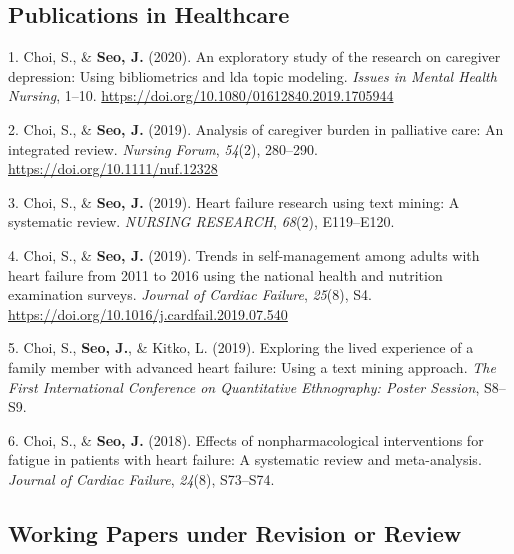 \documentclass[11pt,a4paper,]{awesome-cv}
\begin{document}
\hypertarget{publications-in-healthcare}{%
  \subsection{Publications in
    Healthcare}\label{publications-in-healthcare}}

\hypertarget{bibliography}{}
\leavevmode\hypertarget{ref-doi:10.1080ux2f01612840.2019.1705944}{}%
1. Choi, S., \& \textbf{Seo, J.} (2020). An exploratory study of the
research on caregiver depression: Using bibliometrics and lda topic
modeling. \emph{Issues in Mental Health Nursing}, 1--10.
\url{https://doi.org/10.1080/01612840.2019.1705944}

\leavevmode\hypertarget{ref-doi:10.1111ux2fnuf.12328}{}%
2. Choi, S., \& \textbf{Seo, J.} (2019). Analysis of caregiver burden in
palliative care: An integrated review. \emph{Nursing Forum},
\emph{54}(2), 280--290. \url{https://doi.org/10.1111/nuf.12328}

\leavevmode\hypertarget{ref-choi2019heart}{}%
3. Choi, S., \& \textbf{Seo, J.} (2019). Heart failure research using
text mining: A systematic review. \emph{NURSING RESEARCH}, \emph{68}(2),
E119--E120.

\leavevmode\hypertarget{ref-choi2019trends}{}%
4. Choi, S., \& \textbf{Seo, J.} (2019). Trends in self-management among
adults with heart failure from 2011 to 2016 using the national health
and nutrition examination surveys. \emph{Journal of Cardiac Failure},
\emph{25}(8), S4. \url{https://doi.org/10.1016/j.cardfail.2019.07.540}

\leavevmode\hypertarget{ref-choi2019exploring}{}%
5. Choi, S., \textbf{Seo, J.}, \& Kitko, L. (2019). Exploring the lived
experience of a family member with advanced heart failure: Using a text
mining approach. \emph{The First International Conference on
  Quantitative Ethnography: Poster Session}, S8--S9.

\leavevmode\hypertarget{ref-choi2018effects}{}%
6. Choi, S., \& \textbf{Seo, J.} (2018). Effects of nonpharmacological
interventions for fatigue in patients with heart failure: A systematic
review and meta-analysis. \emph{Journal of Cardiac Failure},
\emph{24}(8), S73--S74.

\hypertarget{working-papers-under-revision-or-review}{%
  \subsection{Working Papers under Revision or
    Review}\label{working-papers-under-revision-or-review}}
\end{document}
